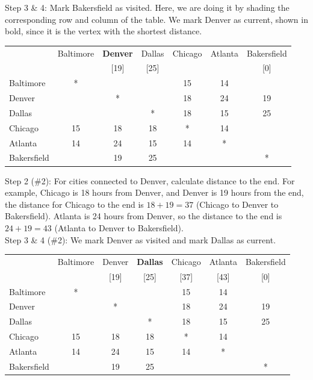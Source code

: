 \begin{example}{}
\noindent Step 3 \& 4:  Mark Bakersfield as visited.  Here, we are doing it by shading the corresponding row and column of the table.  We mark Denver as current, shown in bold, since it is the vertex with the shortest distance.
 \begin{center}
 \begin{tabular}{|l|c|c|c|c|c|c|}
 \hline
 & Baltimore & \textbf{Denver} & Dallas & Chicago & Atlanta & \cellcolor{yellow}Bakersfield\\
 &&[19]&[25]&&&\cellcolor{yellow}[0]\\
 \hline
 Baltimore & * &&&15&14&\cellcolor{yellow}\\
 \hline
 Denver &&*&&18&24&\cellcolor{yellow}19\\
 \hline
Dallas&&&*&18&15&\cellcolor{yellow}25\\
 \hline
 Chicago &15&18&18&*&14&\cellcolor{yellow}\\
 \hline
 Atlanta & 14 & 24&15&14&*&\cellcolor{yellow}\\
 \hline
 \cellcolor{yellow}Bakersfield &\cellcolor{yellow}&\cellcolor{yellow}19&\cellcolor{yellow}25&\cellcolor{yellow}&\cellcolor{yellow}&\cellcolor{yellow}*\\
 \hline
 \end{tabular}
 \end{center}

\noindent Step 2 (\#2):  For cities connected to Denver, calculate distance to the end.  For example, Chicago is 18 hours from Denver, and Denver is 19 hours from the end, the distance for Chicago to the end is $18+19 = 37$  (Chicago to Denver to Bakersfield).  Atlanta is 24 hours from Denver, so the distance to the end is $24+19 = 43$ (Atlanta to Denver to Bakersfield).\\

\noindent Step 3 \& 4 (\#2):  We mark Denver as visited and mark Dallas as current.
 \begin{center}
 \begin{tabular}{|l|c|c|c|c|c|c|}
 \hline
 & Baltimore & \cellcolor{yellow}Denver & \textbf{Dallas} & Chicago & Atlanta & \cellcolor{yellow}Bakersfield\\
 && \cellcolor{yellow}[19]&[25]&[37]&[43]&\cellcolor{yellow}[0]\\
 \hline
 Baltimore & * & \cellcolor{yellow}&&15&14&\cellcolor{yellow}\\
 \hline
  \cellcolor{yellow}Denver & \cellcolor{yellow}& \cellcolor{yellow}*& \cellcolor{yellow}& \cellcolor{yellow}18& \cellcolor{yellow}24&\cellcolor{yellow}19\\
 \hline
Dallas&& \cellcolor{yellow}&*&18&15&\cellcolor{yellow}25\\
 \hline
 Chicago &15& \cellcolor{yellow}18&18&*&14&\cellcolor{yellow}\\
 \hline
 Atlanta & 14 &  \cellcolor{yellow}24&15&14&*&\cellcolor{yellow}\\
 \hline
 \cellcolor{yellow}Bakersfield &\cellcolor{yellow}&\cellcolor{yellow}19&\cellcolor{yellow}25&\cellcolor{yellow}&\cellcolor{yellow}&\cellcolor{yellow}*\\
 \hline
 \end{tabular}
 \end{center}


\end{example}
